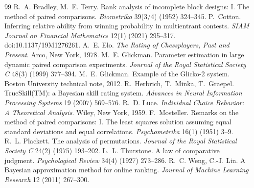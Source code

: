\documentclass[11pt]{article}
\begin{document}
\begin{thebibliography}{99}
 R.~A. Bradley,
M.~E. Terry. Rank analysis of incomplete block designs: I. The method
of paired comparisons. \emph{Biometrika} 39(3/4) (1952) 324--345.
 P.~Cotton. Inferring relative
ability from winning probability in multientrant contests.
\emph{SIAM Journal on Financial Mathematics} 12(1) (2021) 295--317.
doi:10.1137/19M1276261.
 A.~E. Elo. \emph{The Rating of Chessplayers,
Past and Present}. Arco, New York, 1978.
 M.~E. Glickman. Parameter
estimation in large dynamic paired comparison experiments.
\emph{Journal of the Royal Statistical Society C} 48(3) (1999) 377--394.
 M.~E. Glickman. Example of the
Glicko-2 system. Boston University technical note, 2012.
R.~Herbrich, T.~Minka, T.~Graepel. TrueSkill(TM): a Bayesian skill
rating system. \emph{Advances in Neural Information Processing Systems}
19 (2007) 569--576.
 R.~D. Luce. \emph{Individual Choice
Behavior: A Theoretical Analysis}. Wiley, New York, 1959.
 F.~Mosteller. Remarks on the
method of paired comparisons: I. The least squares solution assuming
equal standard deviations and equal correlations. \emph{Psychometrika}
16(1) (1951) 3--9.
 R.~L. Plackett. The analysis of
permutations. \emph{Journal of the Royal Statistical Society C} 24(2)
(1975) 193--202.
 L.~L. Thurstone. A law of
comparative judgment. \emph{Psychological Review} 34(4) (1927) 273--286.
 R.~C. Weng, C.-J. Lin. A
Bayesian approximation method for online ranking. \emph{Journal of
Machine Learning Research} 12 (2011) 267--300.
\end{thebibliography}
\end{document}
